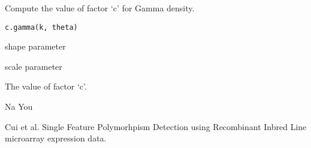 \begin{Description}\relax
Compute the value of factor `c' for Gamma density.
\end{Description}
\begin{Usage}
\begin{verbatim}
c.gamma(k, theta)
\end{verbatim}
\end{Usage}
\begin{Arguments}
\begin{ldescription}
\item[\code{k}] shape parameter

\item[\code{theta}] scale parameter

\end{ldescription}
\end{Arguments}
\begin{Value}
The value of factor `c'.
\end{Value}
\begin{Author}\relax
Na You
\end{Author}
\begin{References}\relax
Cui et al.
Single Feature Polymorhpism Detection using Recombinant Inbred Line
microarray expression data.
\end{References}

